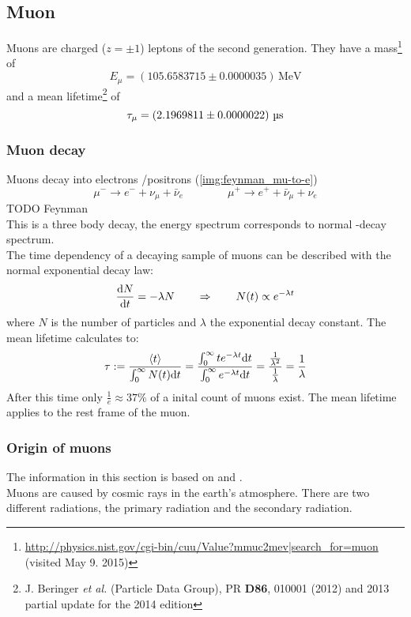 \subsection{Muon}
Muons are charged ($z=\pm1$) leptons of the second generation. They have a mass\footnote{\url{http://physics.nist.gov/cgi-bin/cuu/Value?mmuc2mev|search_for=muon} (visited May 9. 2015)} of 
\begin{equation}
	\label{eq:litval:mass}
    E_\mu = (105.6583715 \pm 0.0000035)\,\text{MeV}
\end{equation}
and a mean lifetime\footnote{J. Beringer \emph{et al.} (Particle Data Group), PR \textbf{D86}, 010001 (2012) and 2013 partial update for the 2014 edition} of 
\begin{equation}
	\label{eq:litval:meanlifetime}
    \tau_\mu = \left( 2.1969811 \pm 0.0000022 \right)\,\text{\textmu s}
\end{equation}
\subsubsection{Muon decay}
\label{sub:decay}
Muons decay into electrons /positrons (\autoref{img:feynman_mu-to-e})
\begin{equation}
	\mu^- \rightarrow e^- + \nu_\mu + \bar{\nu}_e \qquad \qquad \mu^+ \rightarrow e^+ + \bar{\nu}_\mu + \nu_e
\end{equation}
TODO Feynman \\%
This is a three body decay, the energy spectrum corresponds to normal \textbeta-decay spectrum. \\
The time dependency of a decaying sample of muons can be described with the normal exponential decay law:
\begin{equation}
	\label{eq:expdecay}
	\frac{\mathrm{d} N}{\mathrm{d} t} = - \lambda N \qquad \Rightarrow \qquad N(t) \propto e^{-\lambda t}
\end{equation}
where $N$ is the number of particles and $\lambda$ the exponential decay constant. The mean lifetime calculates to:
\begin{equation}
    \tau := \frac{\left<t\right>}{\int_0^\infty N(t) \mathrm{d} t} = 
    \frac{\int_0^\infty t e^{-\lambda t} \mathrm{d} t}{\int_0^\infty e^{-\lambda t} \mathrm{d} t} = 
    \frac{\frac{1}{\lambda^2}}{\frac{1}{\lambda}} = \frac{1}{\lambda}
\end{equation}
After this time only $\frac{1}{e} \approx 37\%$ of a inital count of muons exist. The mean lifetime applies to the rest frame of the muon.
\subsubsection{Origin of muons}
The information in this section is based on \cite{kosmische-strahlung} and \cite{staatsex}.\\
Muons are caused by cosmic rays in the earth's atmosphere. There are two different radiations, the primary radiation and the secondary radiation.
